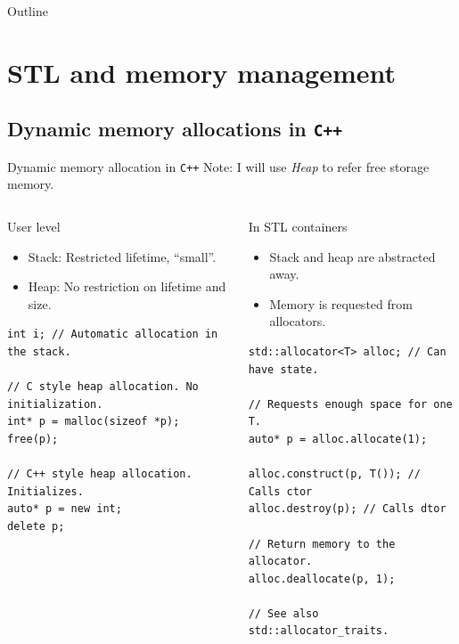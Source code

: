 \documentclass[10pt,aspectratio=169]{beamer}
\begin{document}
\begin{frame}{Outline}
   \tableofcontents
\end{frame}

\section{STL and memory management}

\subsection{Dynamic memory allocations in \texttt{C++}}

\begin{frame}[fragile]{Dynamic memory allocation in \texttt{C++}}
{Note: I will use {\it Heap} to refer free storage memory.}
\begin{columns}
\begin{column}[t]{0.45\textwidth}
\begin{block}{User level}
\begin{itemize}
\item Stack: Restricted lifetime, ``small''.
\item Heap: No restriction on lifetime and size.
\end{itemize}
\end{block}
\begin{lstlisting}
int i; // Automatic allocation in the stack.

// C style heap allocation. No initialization.
int* p = malloc(sizeof *p);
free(p);

// C++ style heap allocation. Initializes.
auto* p = new int;
delete p;
\end{lstlisting}
\end{column}

\begin{column}[t]{0.45\textwidth}
\begin{block}{In STL containers}
\begin{itemize}
\item Stack and heap are abstracted away.
\item Memory is requested from allocators.
\end{itemize}
\end{block}
\begin{lstlisting}
std::allocator<T> alloc; // Can have state.

// Requests enough space for one T.
auto* p = alloc.allocate(1);

alloc.construct(p, T()); // Calls ctor
alloc.destroy(p); // Calls dtor

// Return memory to the allocator.
alloc.deallocate(p, 1);

// See also std::allocator_traits.
\end{lstlisting}
\end{column}
\end{columns}
\end{frame}
\end{document}
